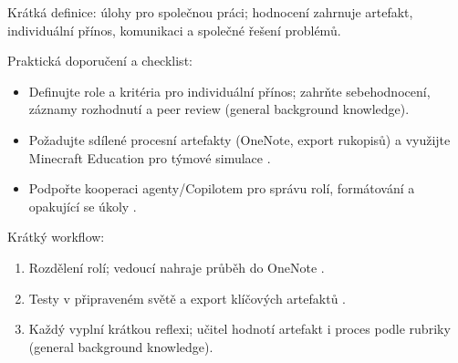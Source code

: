 Krátká definice: úlohy pro společnou práci; hodnocení zahrnuje artefakt, individuální přínos, komunikaci a společné řešení problémů.

Praktická doporučení a checklist:
\begin{itemize}
  \item Definujte role a kritéria pro individuální přínos; zahrňte sebehodnocení, záznamy rozhodnutí a peer review (general background knowledge).
  \item Požadujte sdílené procesní artefakty (OneNote, export rukopisů) \cite{kb_ai_101_tipu_pdf_04e4a115_page_8_1} a využijte Minecraft Education pro týmové simulace \cite{kb_ai_101_tipu_pdf_04e4a115_page_15_2}.
  \item Podpořte kooperaci agenty/Copilotem pro správu rolí, formátování a opakující se úkoly \cite{kb_ai_101_tipu_pdf_04e4a115_page_31_1}.
\end{itemize}

Krátký workflow: \begin{enumerate} \item Rozdělení rolí; vedoucí nahraje průběh do OneNote \cite{kb_ai_101_tipu_pdf_04e4a115_page_8_1}. \item Testy v připraveném světě a export klíčových artefaktů \cite{kb_ai_101_tipu_pdf_04e4a115_page_15_2}. \item Každý vyplní krátkou reflexi; učitel hodnotí artefakt i proces podle rubriky (general background knowledge). \end{enumerate}